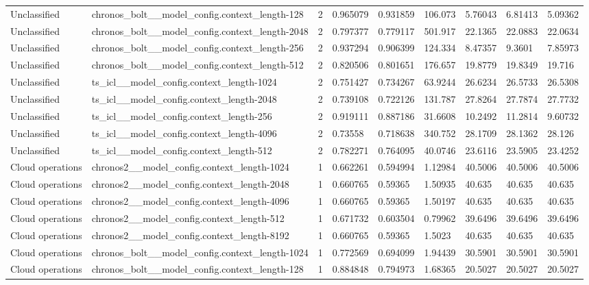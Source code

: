 \begin{tabular}{lllllllll}
Unclassified & chronos\_bolt\_\_model\_config.context\_length-128 & 2 & 0.965079 & 0.931859 & 106.073 & 5.76043 & 6.81413 & 5.09362 \\
Unclassified & chronos\_bolt\_\_model\_config.context\_length-2048 & 2 & 0.797377 & 0.779117 & 501.917 & 22.1365 & 22.0883 & 22.0634 \\
Unclassified & chronos\_bolt\_\_model\_config.context\_length-256 & 2 & 0.937294 & 0.906399 & 124.334 & 8.47357 & 9.3601 & 7.85973 \\
Unclassified & chronos\_bolt\_\_model\_config.context\_length-512 & 2 & 0.820506 & 0.801651 & 176.657 & 19.8779 & 19.8349 & 19.716 \\
Unclassified & ts\_icl\_\_model\_config.context\_length-1024 & 2 & 0.751427 & 0.734267 & 63.9244 & 26.6234 & 26.5733 & 26.5308 \\
Unclassified & ts\_icl\_\_model\_config.context\_length-2048 & 2 & 0.739108 & 0.722126 & 131.787 & 27.8264 & 27.7874 & 27.7732 \\
Unclassified & ts\_icl\_\_model\_config.context\_length-256 & 2 & 0.919111 & 0.887186 & 31.6608 & 10.2492 & 11.2814 & 9.60732 \\
Unclassified & ts\_icl\_\_model\_config.context\_length-4096 & 2 & 0.73558 & 0.718638 & 340.752 & 28.1709 & 28.1362 & 28.126 \\
Unclassified & ts\_icl\_\_model\_config.context\_length-512 & 2 & 0.782271 & 0.764095 & 40.0746 & 23.6116 & 23.5905 & 23.4252 \\
Cloud operations & chronos2\_\_model\_config.context\_length-1024 & 1 & 0.662261 & 0.594994 & 1.12984 & 40.5006 & 40.5006 & 40.5006 \\
Cloud operations & chronos2\_\_model\_config.context\_length-2048 & 1 & 0.660765 & 0.59365 & 1.50935 & 40.635 & 40.635 & 40.635 \\
Cloud operations & chronos2\_\_model\_config.context\_length-4096 & 1 & 0.660765 & 0.59365 & 1.50197 & 40.635 & 40.635 & 40.635 \\
Cloud operations & chronos2\_\_model\_config.context\_length-512 & 1 & 0.671732 & 0.603504 & 0.79962 & 39.6496 & 39.6496 & 39.6496 \\
Cloud operations & chronos2\_\_model\_config.context\_length-8192 & 1 & 0.660765 & 0.59365 & 1.5023 & 40.635 & 40.635 & 40.635 \\
Cloud operations & chronos\_bolt\_\_model\_config.context\_length-1024 & 1 & 0.772569 & 0.694099 & 1.94439 & 30.5901 & 30.5901 & 30.5901 \\
Cloud operations & chronos\_bolt\_\_model\_config.context\_length-128 & 1 & 0.884848 & 0.794973 & 1.68365 & 20.5027 & 20.5027 & 20.5027 \\

\end{tabular}

